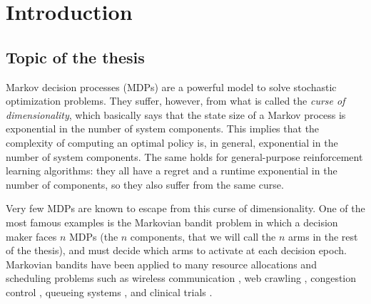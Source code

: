 \begingroup
\let\clearpage\relax

\chapter{Introduction}
\label{chapter:introduction}


\section{Topic of the thesis}

Markov decision processes (MDPs) are a powerful model to solve stochastic optimization problems. They suffer, however, from what is called the \emph{curse of dimensionality}, which basically says that the state size of a Markov process is exponential in the number of system components. This implies that the complexity of computing an optimal policy is, in general, exponential in the number of system components. The same holds for general-purpose reinforcement learning algorithms: they all have a regret and a runtime exponential in the number of components, so they also suffer from the same curse.

Very few MDPs are known to escape from this curse of dimensionality. One of the most famous examples is the Markovian bandit problem in which a decision maker faces $n$ MDPs (the $n$ components, that we will call the $n$ arms in the rest of the thesis), and must decide which arms to activate at each decision epoch.
Markovian bandits have been applied to many resource allocations and scheduling problems such as wireless communication \cite{raghunathan2008index, liu2010indexability, aalto2019whittle}, web crawling \cite{nino2014dynamic, avrachenkov2022whittle}, congestion control \cite{avrachenkov2013congestion, avrachenkov2018impulsive}, queueing systems \cite{glazebrook2009index, aalto2009gittins, archibald2009indexability, aalto2011properties, larranaga2015asymptotically, borkar2017whittle, scully2018soap}, and clinical trials \cite{villar2015multi}.


